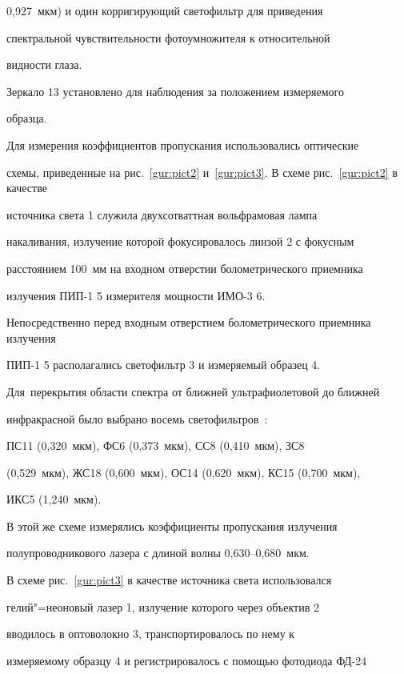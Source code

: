 0,927~мкм) и один корригирующий светофильтр для приведения

спектральной чувствительности фотоумножителя к относительной

видности глаза.



Зеркало 13 установлено для наблюдения за положением измеряемого

образца.



Для измерения коэффициентов пропускания использовались оптические

схемы, приведенные на рис.~\ref{gur:pict2} и~\ref{gur:pict3}. В схеме рис.~\ref{gur:pict2} в качестве

источника света 1 служила двухсотваттная вольфрамовая лампа

накаливания, излучение которой фокусировалось линзой 2 с фокусным

расстоянием 100~мм на входном отверстии болометрического приемника

излучения ПИП-1 5 измерителя мощности ИМО-3 6. 

Непосредственно перед входным отверстием болометрического приемника излучения

ПИП-1 5 располагались светофильтр 3 и измеряемый образец 4. 

Для~перекрытия области спектра от ближней ультрафиолетовой до ближней

инфракрасной было выбрано восемь светофильтров~\cite{gur:bib:4}:

ПС11 (0,320~мкм), ФС6 (0,373~мкм), СС8 (0,410~мкм), ЗС8

(0,529~мкм), ЖС18 (0,600~мкм), ОС14 (0,620~мкм), КС15 (0,700~мкм),

ИКС5 (1,240~мкм).







В этой же схеме измерялись коэффициенты пропускания излучения

полупроводникового лазера с длиной волны 0,630--0,680~мкм.



В схеме рис.~\ref{gur:pict3} в качестве источника света использовался

гелий"=неоновый лазер 1, излучение которого через объектив 2

вводилось в оптоволокно 3, транспортировалось по нему к

измеряемому образцу 4 и регистрировалось с помощью фотодиода ФД-24

